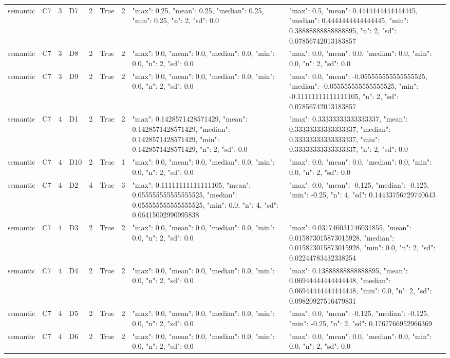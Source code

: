 \begin{tabular}{lllllllll}
semantic & C7 & 3 & D7 & 2 & True & 2 & {"max": 0.25, "mean": 0.25, "median": 0.25, "min": 0.25, "n": 2, "sd": 0.0} & {"max": 0.5, "mean": 0.4444444444444445, "median": 0.4444444444444445, "min": 0.38888888888888895, "n": 2, "sd": 0.07856742013183857} \\
semantic & C7 & 3 & D8 & 2 & True & 2 & {"max": 0.0, "mean": 0.0, "median": 0.0, "min": 0.0, "n": 2, "sd": 0.0} & {"max": 0.0, "mean": 0.0, "median": 0.0, "min": 0.0, "n": 2, "sd": 0.0} \\
semantic & C7 & 3 & D9 & 2 & True & 2 & {"max": 0.0, "mean": 0.0, "median": 0.0, "min": 0.0, "n": 2, "sd": 0.0} & {"max": 0.0, "mean": -0.055555555555555525, "median": -0.055555555555555525, "min": -0.11111111111111105, "n": 2, "sd": 0.07856742013183857} \\
semantic & C7 & 4 & D1 & 2 & True & 2 & {"max": 0.1428571428571429, "mean": 0.1428571428571429, "median": 0.1428571428571429, "min": 0.1428571428571429, "n": 2, "sd": 0.0} & {"max": 0.33333333333333337, "mean": 0.33333333333333337, "median": 0.33333333333333337, "min": 0.33333333333333337, "n": 2, "sd": 0.0} \\
semantic & C7 & 4 & D10 & 2 & True & 1 & {"max": 0.0, "mean": 0.0, "median": 0.0, "min": 0.0, "n": 2, "sd": 0.0} & {"max": 0.0, "mean": 0.0, "median": 0.0, "min": 0.0, "n": 2, "sd": 0.0} \\
semantic & C7 & 4 & D2 & 4 & True & 3 & {"max": 0.11111111111111105, "mean": 0.055555555555555525, "median": 0.055555555555555525, "min": 0.0, "n": 4, "sd": 0.06415002990995838} & {"max": 0.0, "mean": -0.125, "median": -0.125, "min": -0.25, "n": 4, "sd": 0.14433756729740643} \\
semantic & C7 & 4 & D3 & 2 & True & 2 & {"max": 0.0, "mean": 0.0, "median": 0.0, "min": 0.0, "n": 2, "sd": 0.0} & {"max": 0.031746031746031855, "mean": 0.015873015873015928, "median": 0.015873015873015928, "min": 0.0, "n": 2, "sd": 0.02244783432338254} \\
semantic & C7 & 4 & D4 & 2 & True & 2 & {"max": 0.0, "mean": 0.0, "median": 0.0, "min": 0.0, "n": 2, "sd": 0.0} & {"max": 0.13888888888888895, "mean": 0.06944444444444448, "median": 0.06944444444444448, "min": 0.0, "n": 2, "sd": 0.09820927516479831} \\
semantic & C7 & 4 & D5 & 2 & True & 2 & {"max": 0.0, "mean": 0.0, "median": 0.0, "min": 0.0, "n": 2, "sd": 0.0} & {"max": 0.0, "mean": -0.125, "median": -0.125, "min": -0.25, "n": 2, "sd": 0.1767766952966369} \\
semantic & C7 & 4 & D6 & 2 & True & 2 & {"max": 0.0, "mean": 0.0, "median": 0.0, "min": 0.0, "n": 2, "sd": 0.0} & {"max": 0.0, "mean": 0.0, "median": 0.0, "min": 0.0, "n": 2, "sd": 0.0} \\

\end{tabular}
